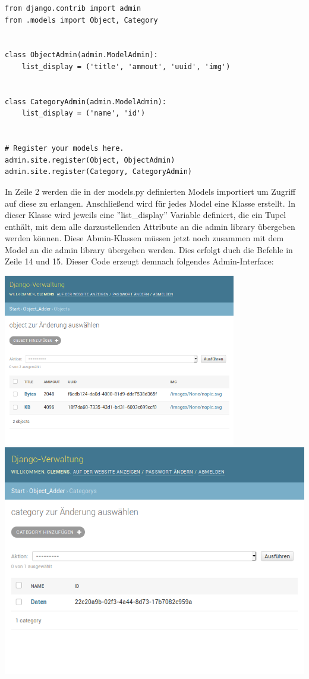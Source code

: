 \documentclass{article}
\begin{document}
\begin{verbatim}
from django.contrib import admin
from .models import Object, Category


class ObjectAdmin(admin.ModelAdmin):
	list_display = ('title', 'ammout', 'uuid', 'img')


class CategoryAdmin(admin.ModelAdmin):
	list_display = ('name', 'id')


# Register your models here.
admin.site.register(Object, ObjectAdmin)
admin.site.register(Category, CategoryAdmin)
\end{verbatim}
In Zeile 2 werden die in der models.py definierten Models importiert um Zugriff auf diese zu erlangen.
\newline
Anschließend wird für jedes Model eine Klasse erstellt. In dieser Klasse wird jeweils eine ''list\_display'' Variable definiert, die ein Tupel enthält, mit dem alle darzustellenden Attribute an die admin library übergeben werden können. Diese Abmin-Klassen müssen jetzt noch zusammen mit dem Model an die admin library übergeben werden. Dies erfolgt duch die Befehle in Zeile 14 und 15. Dieser Code erzeugt demnach folgendes Admin-Interface:
\newline
\begin{center}
\includegraphics[width=\linewidth, height=7.5cm]{django_admin_objects.png}
\quad
\\[\baselineskip]%
\includegraphics[width=\linewidth]{django_admin_cats.png}
\end{center}
\end{document}
